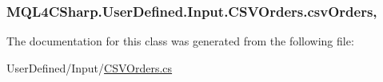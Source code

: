 \subsubsection[{\texorpdfstring{csv\+Orders}{csvOrders}}]{ M\+Q\+L4\+C\+Sharp.\+User\+Defined.\+Input.\+C\+S\+V\+Orders.\+csv\+Orders\hspace{0.3cm}{\ttfamily [static]}, {\ttfamily [get]}}\hypertarget{class_m_q_l4_c_sharp_1_1_user_defined_1_1_input_1_1_c_s_v_orders_aa2834764d0fd1ec6191799b5cd5afbac}{}\label{class_m_q_l4_c_sharp_1_1_user_defined_1_1_input_1_1_c_s_v_orders_aa2834764d0fd1ec6191799b5cd5afbac}


The documentation for this class was generated from the following file\+:\begin{DoxyCompactItemize}
\item 
User\+Defined/\+Input/\hyperlink{_c_s_v_orders_8cs}{C\+S\+V\+Orders.\+cs}\end{DoxyCompactItemize}
